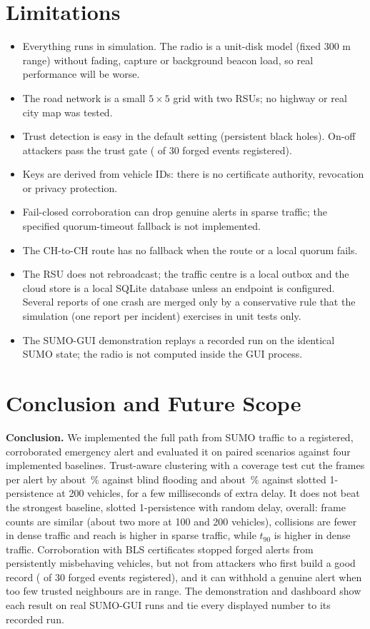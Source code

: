 \documentclass[11pt, a4paper]{article}
\begin{document}
\section{Limitations}
\label{sec:limits}
\begin{itemize}[noitemsep, topsep=2pt]
  \item Everything runs in simulation. The radio is a unit-disk model (fixed 300 m range) without fading, capture or
        background beacon load, so real performance will be worse.
  \item The road network is a small $5\times5$ grid with two RSUs; no highway or real city map was tested.
  \item Trust detection is easy in the default setting (persistent black holes). On-off attackers pass the trust gate
        (\NForgOnOffNine{} of 30 forged events registered).
  \item Keys are derived from vehicle IDs: there is no certificate authority, revocation or privacy protection.
  \item Fail-closed corroboration can drop genuine alerts in sparse traffic; the specified quorum-timeout fallback is not
        implemented.
  \item The CH-to-CH route has no fallback when the route or a local quorum fails.
  \item The RSU does not rebroadcast; the traffic centre is a local outbox and the cloud store is a local SQLite database
        unless an endpoint is configured. Several reports of one crash are merged only by a conservative rule that the
        simulation (one report per incident) exercises in unit tests only.
  \item The SUMO-GUI demonstration replays a recorded run on the identical SUMO state; the radio is not computed inside
        the GUI process.
\end{itemize}

\section{Conclusion and Future Scope}
\noindent\textbf{Conclusion.} We implemented the full path from SUMO traffic to a registered, corroborated emergency
alert and evaluated it on \NScenarios{} paired scenarios against four implemented baselines. Trust-aware clustering with a
coverage test cut the frames per alert by about \NCutVsFlood\,\% against blind flooding and about \NCutVsSlot\,\% against
slotted 1-persistence at 200 vehicles, for a few milliseconds of extra delay. It does not beat the strongest baseline,
slotted 1-persistence with random delay, overall: frame counts are similar (about two more at 100 and 200 vehicles),
collisions are fewer in dense traffic and reach is higher in sparse traffic, while $t_{90}$ is higher in dense traffic.
Corroboration with BLS certificates stopped forged alerts from persistently misbehaving vehicles, but not from
attackers who first build a good record (\NForgOnOffNine{} of 30 forged events registered), and it can withhold a
genuine alert when too few trusted neighbours are in range. The demonstration and dashboard show each result on real
SUMO-GUI runs and tie every displayed number to its recorded run.
\end{document}
